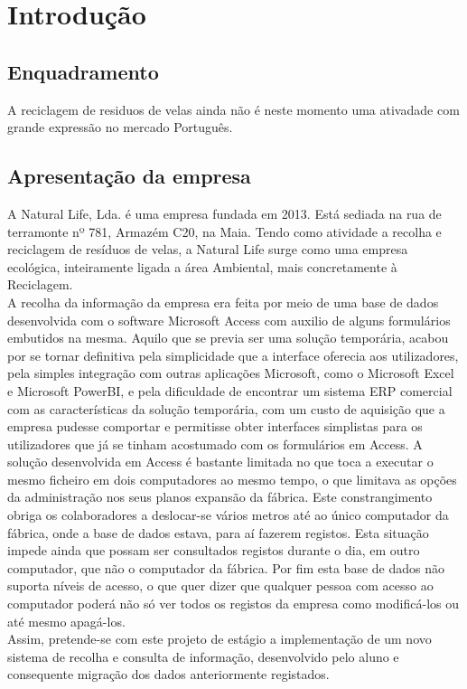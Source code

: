 \chapter{Introdução}
\label{cap:1}

\section{Enquadramento}
A reciclagem de residuos de velas ainda não é neste momento uma ativadade com grande expressão no mercado Português. 

\section{Apresentação da empresa}
A Natural Life, Lda. é uma empresa fundada em 2013. Está sediada na rua de terramonte nº 781, Armazém C20, na Maia. Tendo como atividade a recolha e reciclagem de resíduos de velas, a Natural Life surge como uma empresa ecológica, inteiramente ligada a área Ambiental, mais concretamente à Reciclagem.\cite{NaturalLife}\\
A recolha da informação da empresa era feita por meio de uma base de dados desenvolvida com o software Microsoft Access\label{sym:MS_ACCESS} com auxilio de alguns formulários embutidos na mesma. Aquilo que se previa ser uma solução temporária, acabou por se tornar definitiva pela simplicidade que a interface oferecia aos utilizadores, pela simples integração com outras aplicações Microsoft, como o Microsoft Excel\label{sym:MS_EXCEL} e Microsoft PowerBI\label{sym:MS_POWERBI}, e pela dificuldade de encontrar um sistema ERP\label{sym:ERP} comercial com as características da solução temporária, com um custo de aquisição que a empresa pudesse comportar e permitisse obter interfaces simplistas para os utilizadores que já se tinham acostumado com os formulários em Access.
A solução desenvolvida em Access é bastante limitada no que toca a executar o mesmo ficheiro em dois computadores ao mesmo tempo, o que limitava as opções da administração nos seus planos expansão da fábrica. Este constrangimento obriga os colaboradores a deslocar-se vários metros até ao único computador da fábrica, onde a base de dados estava, para aí fazerem registos. Esta situação impede ainda que possam ser consultados registos durante o dia, em outro computador, que não o computador da fábrica. Por fim esta base de dados não suporta níveis de acesso, o que quer dizer que qualquer pessoa com acesso ao computador poderá não só ver todos os registos da empresa como modificá-los ou até mesmo apagá-los.\\
Assim, pretende-se com este projeto de estágio a implementação de um novo sistema de recolha e consulta de informação, desenvolvido pelo aluno e consequente migração dos dados anteriormente registados.
\newpage




